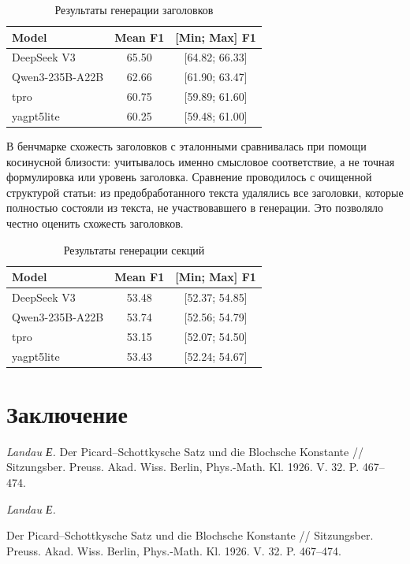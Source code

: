 \documentclass{article}
\theoremstyle{definition}
\theoremstyle{plain}
\begin{document}
\begin{table}[ht]
\centering
\caption{Результаты генерации заголовков}
\begin{tabular}{l|c|c}
\hline
\textbf{Model} & \textbf{Mean F1} & \textbf{[Min; Max] F1} \\
\hline
DeepSeek V3 & 65.50 & [64.82; 66.33] \\
Qwen3-235B-A22B  & 62.66 & [61.90; 63.47] \\
tpro & 60.75 & [59.89; 61.60] \\
yagpt5lite & 60.25 & [59.48; 61.00] \\
\hline
\end{tabular}
\end{table}

В бенчмарке схожесть заголовков с эталонными сравнивалась при помощи косинусной близости: учитывалось именно смысловое соответствие, а не точная формулировка или уровень заголовка. 
Сравнение проводилось с очищенной структурой статьи: из предобработанного текста удалялись все заголовки, которые полностью состояли из текста, не участвовавшего в генерации. Это позволяло честно оценить схожесть заголовков.


\begin{table}[ht]
\centering
\caption{Результаты генерации секций}
\begin{tabular}{l|c|c}
\hline
\textbf{Model} & \textbf{Mean F1} & \textbf{[Min; Max] F1} \\
\hline
DeepSeek V3 & 53.48 & [52.37; 54.85] \\
Qwen3-235B-A22B  & 53.74 & [52.56; 54.79] \\
tpro & 53.15 & [52.07; 54.50] \\
yagpt5lite & 53.43 & [52.24; 54.67] \\
\hline
\end{tabular}
\end{table}



\section*{Заключение}


\begin{thebibliography}{99}

\textit{Landau Е.}
Der Picard--Schottkysche Satz und die Blochsche Konstante //
Sitzungsber. Preuss. Akad. Wiss. Berlin, Phys.-Math. Kl. 1926. V. 32. P. 467--474.

\end{thebibliography}

\renewcommand\refname{References}



\begin{thebibliography}{99}
\textit{Landau Е.}

Der Picard--Schottkysche Satz und die Blochsche Konstante //
Sitzungsber. Preuss. Akad. Wiss. Berlin, Phys.-Math. Kl. 1926. V. 32. P. 467--474.

\end{thebibliography}
\end{document}
